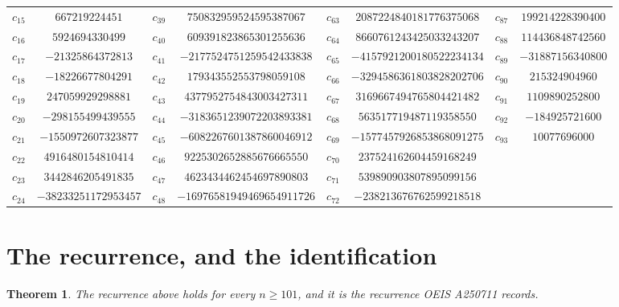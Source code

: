 \documentclass[11pt,a4paper]{article}
\theoremstyle{plain}
\newtheorem{theorem}{Theorem}
\theoremstyle{definition}
\begin{document}
\begin{center}
\begin{tabular}{cccccccc}
$c_{15}$ & $667219224451$ & $c_{39}$ & $750832959524595387067$ & $c_{63}$ & $2087224840181776375068$ & $c_{87}$ & $199214228390400$ \\
$c_{16}$ & $5924694330499$ & $c_{40}$ & $609391823865301255636$ & $c_{64}$ & $8660761243425033243207$ & $c_{88}$ & $114436848742560$ \\
$c_{17}$ & $-21325864372813$ & $c_{41}$ & $-2177524751259542433838$ & $c_{65}$ & $-4157921200180522234134$ & $c_{89}$ & $-31887156340800$ \\
$c_{18}$ & $-18226677804291$ & $c_{42}$ & $179343552553798059108$ & $c_{66}$ & $-3294586361803828202706$ & $c_{90}$ & $215324904960$ \\
$c_{19}$ & $247059929298881$ & $c_{43}$ & $4377952754843003427311$ & $c_{67}$ & $3169667494765804421482$ & $c_{91}$ & $1109890252800$ \\
$c_{20}$ & $-298155499439555$ & $c_{44}$ & $-3183651239072203893381$ & $c_{68}$ & $563517719487119358550$ & $c_{92}$ & $-184925721600$ \\
$c_{21}$ & $-1550972607323877$ & $c_{45}$ & $-6082267601387860046912$ & $c_{69}$ & $-1577457926853868091275$ & $c_{93}$ & $10077696000$ \\
$c_{22}$ & $4916480154810414$ & $c_{46}$ & $9225302652885676665550$ & $c_{70}$ & $237524162604459168249$ &  &  \\
$c_{23}$ & $3442846205491835$ & $c_{47}$ & $4623434462454697890803$ & $c_{71}$ & $539890903807895099156$ &  &  \\
$c_{24}$ & $-38233251172953457$ & $c_{48}$ & $-16976581949469654911726$ & $c_{72}$ & $-238213676762599218518$ &  &  \\
\end{tabular}
\end{center}

\section{The recurrence, and the identification}

\begin{theorem}
The recurrence above holds for every $n\ge101$, and it is the recurrence OEIS A250711 records.
\end{theorem}
\end{document}
